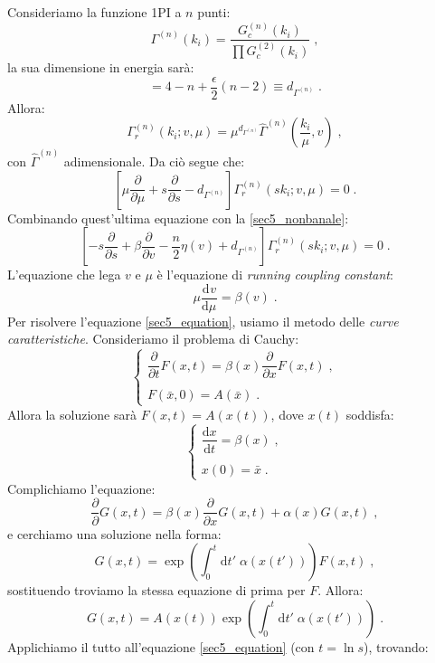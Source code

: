 \documentclass[12pt,a4paper]{article}
\theoremstyle{definition}
\newcommand{\dev}[3][]{\frac{\mathrm{d}^{#1} #2}{\mathrm{d} #3^{#1}}}
\numberwithin{equation}{section}
\newcommand{\diff}[1][]{\mathrm{d}#1}
\begin{document}
Consideriamo la funzione 1PI a $n$ punti:
$$
\Gamma^{(n)}(k_i)=\frac{G_c^{(n)}(k_i)}{\displaystyle\prod G_c^{(2)}(k_i)}\;,
$$
la sua dimensione in energia sarà:
\begin{equation}
[\Gamma^{(n)}]=4-n+\frac{\epsilon}{2}(n-2)\equiv d_{\Gamma^{(n)}}\;.
\end{equation}
Allora:
\begin{equation}
\Gamma_r^{(n)}(k_i;v,\mu)=\mu^{d_{\Gamma^{(n)}}}\hat{\Gamma}^{(n)}\left(\frac{k_i}{\mu},v\right)\;,
\end{equation}
con $\hat{\Gamma}^{(n)}$  adimensionale. Da ciò segue che:
\begin{equation}
\boxed{
\left[\mu\frac{\partial}{\partial\mu}+s\frac{\partial}{\partial s}-d_{\Gamma^{(n)}}\right]\Gamma_r^{(n)}(sk_i;v,\mu)=0
}\;. \label{sec5_equation}
\end{equation}
Combinando quest'ultima equazione con la \eqref{sec5_nonbanale}:
\begin{equation}
\boxed{
\left[-s\frac{\partial}{\partial s}+\beta\frac{\partial}{\partial v}-\frac{n}{2}\eta(v)+d_{\Gamma^{(n)}}\right]\Gamma_r^{(n)}(sk_i;v,\mu)=0
}\;.
\end{equation}
L'equazione che lega $v$ e $\mu$ è l'equazione di \emph{running coupling constant}:
\begin{equation}
\boxed{
\mu\dev{v}{\mu}=\beta(v)
}\;.
\end{equation}
Per risolvere l'equazione \eqref{sec5_equation}, usiamo il metodo delle \emph{curve caratteristiche}. Consideriamo il problema di Cauchy:
$$
\begin{cases}
\dfrac{\partial}{\partial t}F(x,t)=\beta(x)\dfrac{\partial}{\partial x}F(x,t)\;, \\
\\
F(\bar{x},0)=A(\bar{x})\;.
\end{cases}
$$
Allora la soluzione sarà $F(x,t)=A(x(t))$, dove $x(t)$ soddisfa:
$$
\begin{cases}
\dfrac{\diff{x}}{\diff{t}}=\beta(x)\;, \\
\\
x(0)=\bar{x}\;.
\end{cases}
$$
Complichiamo l'equazione:
$$
\frac{\partial}{\partial}G(x,t)=\beta(x)\frac{\partial}{\partial x}G(x,t)+\alpha(x)G(x,t)\;,
$$
e cerchiamo una soluzione nella forma:
$$
G(x,t)=\exp\left(\int_0^t\diff{t'}\;\alpha(x(t'))\right)F(x,t)\;,
$$
sostituendo troviamo la stessa equazione di prima per $F$. Allora:
$$
G(x,t)=A(x(t))\exp\left(\int_0^t\diff{t'}\;\alpha(x(t'))\right)\;.
$$
Applichiamo il tutto all'equazione \eqref{sec5_equation} (con $t=\ln s$), trovando:
\end{document}

